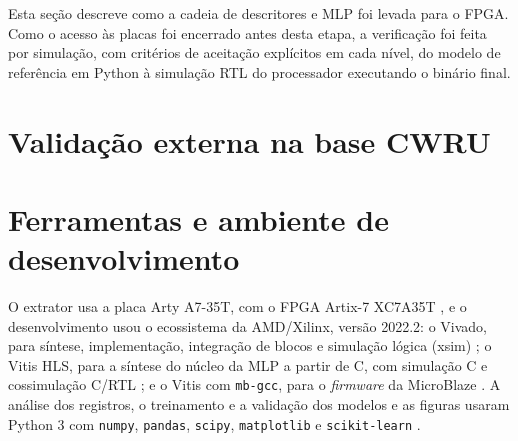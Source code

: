 Esta seção descreve como a cadeia de descritores e MLP foi levada para o FPGA. Como o acesso às placas foi encerrado antes desta etapa, a verificação foi feita por simulação, com critérios de aceitação explícitos em cada nível, do modelo de referência em Python à simulação RTL do processador executando o binário final.



\section{Validação externa na base CWRU}
\label{sec:mm_cwru}



\section{Ferramentas e ambiente de desenvolvimento}
\label{sec:mm_ferramentas}

O extrator usa a placa Arty A7-35T, com o FPGA Artix-7 XC7A35T \cite{xilinx2020ds180}, e o desenvolvimento usou o ecossistema da AMD/Xilinx, versão 2022.2: o Vivado, para síntese, implementação, integração de blocos e simulação lógica (xsim) \cite{amd_ug900}; o Vitis HLS, para a síntese do núcleo da MLP a partir de C, com simulação C e cossimulação C/RTL \cite{amd_ug1399}; e o Vitis com \texttt{mb-gcc}, para o \textit{firmware} da MicroBlaze \cite{amd_ug984}. A análise dos registros, o treinamento e a validação dos modelos e as figuras usaram Python 3 com \texttt{numpy}, \texttt{pandas}, \texttt{scipy}, \texttt{matplotlib} e \texttt{scikit-learn} \cite{pedregosa2011}.
